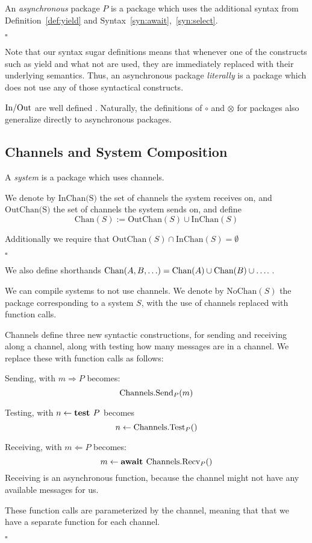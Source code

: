 \begin{definition}
  An \emph{asynchronous} package $P$ is a package which uses the additional
  syntax from Definition~\ref{def:yield} and Syntax~\ref{syn:await},~\ref{syn:select}.

  $\square$
\end{definition}

Note that our syntax sugar definitions means that whenever one of the constructs
such as yield and what not are used, they are immediately replaced with their underlying
semantics. Thus, an asynchronous package \emph{literally} is a package which 
does not use any of those syntactical constructs.

$\text{In/Out}$ are well defined .
Naturally, the definitions of $\circ$ and $\otimes$ for packages also
generalize directly to asynchronous packages.

\subsection{Channels and System Composition}


\begin{definition}[Systems]
A \emph{system} is a package which uses channels.

We denote by $\text{InChan(S)}$ the set of channels the system receives on,
and $\text{OutChan(S)}$ the set of channels the system sends on,
and define
$$
\text{Chan}(S) := \text{OutChan}(S) \cup \text{InChan}(S)
$$

Additionally we require that $\text{OutChan}(S) \cap \text{InChan}(S) = \emptyset$

$\square$
\end{definition}

We also define shorthands $\text{Chan}(A, B, \ldots) = \text{Chan}(A) \cup \text{Chan}(B) \cup \ldots$.
.

\begin{definition}
We can compile systems to not use channels.
We denote by $\text{NoChan}(S)$ the package corresponding to
a system $S$, with the use of channels replaced with function calls.

Channels define three new syntactic constructions, for sending and receiving
along a channel, along with testing how many messages are in a channel.
We replace these with function calls as follows:


Sending, with $m \Rightarrow P$ becomes:
$$
\text{Channels}.\text{Send}_P(m)
$$

Testing, with $n \gets \textbf{test } P$ becomes
$$
n \gets \text{Channels}.\text{Test}_P()
$$

Receiving, with $m \Leftarrow P$ becomes:
$$
m \gets \textbf{await } \text{Channels}.\text{Recv}_P()
$$
Receiving is an asynchronous function, because the channel might not have
any available messages for us.

These function calls are parameterized by the channel, meaning
that that we have a separate function for each channel.

$\square$
\end{definition}

